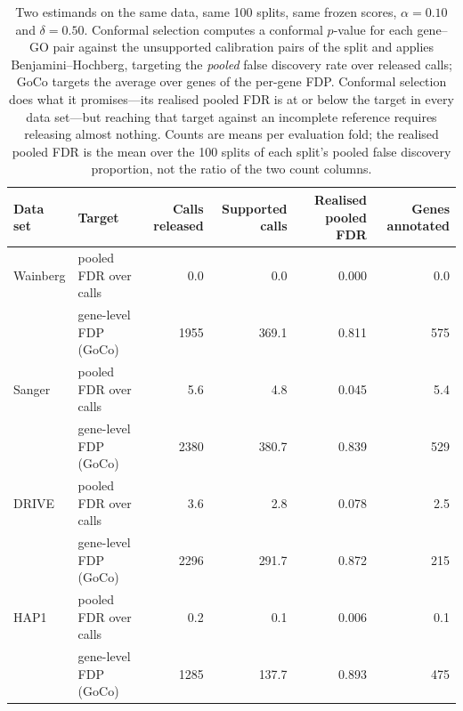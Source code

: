\begin{table}[!htbp]
\centering
\caption{Two estimands on the same data, same 100 splits, same frozen scores, $\alpha=0.10$ and $\delta=0.50$. Conformal selection computes a conformal $p$-value for each gene--GO pair against the unsupported calibration pairs of the split and applies Benjamini--Hochberg, targeting the \emph{pooled} false discovery rate over released calls; GoCo targets the average over genes of the per-gene FDP. Conformal selection does what it promises---its realised pooled FDR is at or below the target in every data set---but reaching that target against an incomplete reference requires releasing almost nothing. Counts are means per evaluation fold; the realised pooled FDR is the mean over the 100 splits of each split's pooled false discovery proportion, not the ratio of the two count columns.}
\label{tab:estimands}
\scriptsize
\begin{tabular}{l l rrrr}
\toprule
Data set & Target & Calls released & Supported calls & Realised pooled FDR & Genes annotated \\ \midrule
Wainberg & pooled FDR over calls & 0.0 & 0.0 & 0.000 & 0.0 \\
 & gene-level FDP (GoCo) & 1955 & 369.1 & 0.811 & 575 \\
\addlinespace
Sanger & pooled FDR over calls & 5.6 & 4.8 & 0.045 & 5.4 \\
 & gene-level FDP (GoCo) & 2380 & 380.7 & 0.839 & 529 \\
\addlinespace
DRIVE & pooled FDR over calls & 3.6 & 2.8 & 0.078 & 2.5 \\
 & gene-level FDP (GoCo) & 2296 & 291.7 & 0.872 & 215 \\
\addlinespace
HAP1 & pooled FDR over calls & 0.2 & 0.1 & 0.006 & 0.1 \\
 & gene-level FDP (GoCo) & 1285 & 137.7 & 0.893 & 475 \\
\bottomrule
\end{tabular}
\end{table}
